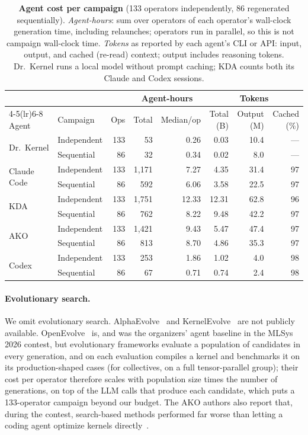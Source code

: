 \begin{table}[t]
  \centering
  \caption{\textbf{Agent cost per campaign} (133 operators independently, 86 regenerated sequentially).
  \emph{Agent-hours}: sum over operators of each operator's wall-clock generation time, including relaunches; operators run in parallel, so this is not campaign wall-clock time.
  \emph{Tokens} as reported by each agent's CLI or API: input, output, and cached (re-read) context; output includes reasoning tokens.
  Dr.~Kernel runs a local model without prompt caching; KDA counts both its Claude and Codex sessions.}
  \label{fastkernels:tab:agent-cost}
  \small
  \setlength{\tabcolsep}{4pt}
\begin{tabular}{@{}ll r rr rrr@{}}
\toprule
 & & & \multicolumn{2}{c}{\textbf{Agent-hours}} & \multicolumn{3}{c}{\textbf{Tokens}} \\
\cmidrule(lr){4-5}\cmidrule(lr){6-8}
Agent & Campaign & Ops & Total & Median/op & Total (B) & Output (M) & Cached (\%) \\
\midrule
\multirow{2}{*}{Dr.~Kernel} & Independent & 133 & 53 & 0.26 & 0.03 & 10.4 & --- \\
 & Sequential & 86 & 32 & 0.34 & 0.02 & 8.0 & --- \\
\midrule
\multirow{2}{*}{Claude Code} & Independent & 133 & 1,171 & 7.27 & 4.35 & 31.4 & 97 \\
 & Sequential & 86 & 592 & 6.06 & 3.58 & 22.5 & 97 \\
\midrule
\multirow{2}{*}{KDA} & Independent & 133 & 1,751 & 12.33 & 12.31 & 62.8 & 96 \\
 & Sequential & 86 & 762 & 8.22 & 9.48 & 42.2 & 97 \\
\midrule
\multirow{2}{*}{AKO} & Independent & 133 & 1,421 & 9.43 & 5.47 & 47.4 & 97 \\
 & Sequential & 86 & 813 & 8.70 & 4.86 & 35.3 & 97 \\
\midrule
\multirow{2}{*}{Codex} & Independent & 133 & 253 & 1.86 & 1.02 & 4.0 & 98 \\
 & Sequential & 86 & 67 & 0.71 & 0.74 & 2.4 & 98 \\
\bottomrule
\end{tabular}
\end{table}

\paragraph{Evolutionary search.}
We omit evolutionary search.
AlphaEvolve~\citep{alphaevolve} and KernelEvolve~\citep{kernelevolve} are not publicly available.
OpenEvolve~\citep{openevolve} is, and was the organizers' agent baseline in the MLSys 2026 contest, but evolutionary frameworks evaluate a population of candidates in every generation, and on \FastKernels each evaluation compiles a kernel and benchmarks it on its production-shaped cases (for collectives, on a full tensor-parallel group); their cost per operator therefore scales with population size times the number of generations, on top of the LLM calls that produce each candidate, which puts a 133-operator campaign beyond our budget.
The AKO authors also report that, during the contest, search-based methods performed far worse than letting a coding agent optimize kernels directly~\citep{ako}.

